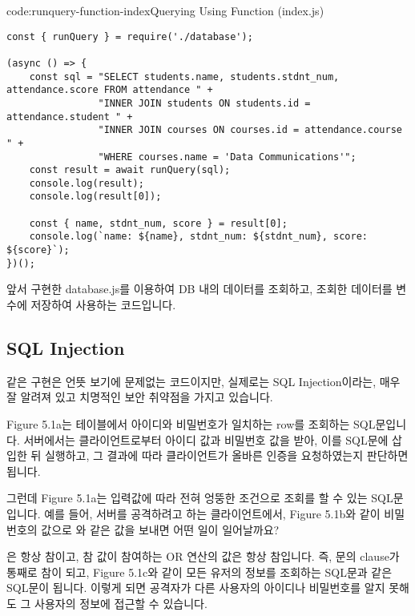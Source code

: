 \begin{codeenv}{code:runquery-function-index}{Querying Using  Function (index.js)}\begin{verbatim}
const { runQuery } = require('./database');

(async () => {
    const sql = "SELECT students.name, students.stdnt_num, attendance.score FROM attendance " +
                "INNER JOIN students ON students.id = attendance.student " +
                "INNER JOIN courses ON courses.id = attendance.course " +
                "WHERE courses.name = 'Data Communications'";
    const result = await runQuery(sql);
    console.log(result);
    console.log(result[0]);

    const { name, stdnt_num, score } = result[0];
    console.log(`name: ${name}, stdnt_num: ${stdnt_num}, score: ${score}`);
})();
\end{verbatim}
\end{codeenv}

\는 앞서 구현한 database.js를 이용하여 DB 내의 데이터를 조회하고, 조회한 데이터를 변수에 저장하여 사용하는 코드입니다.

\subsection*{SQL Injection}

\과 같은 구현은 언뜻 보기에 문제없는 코드이지만, 실제로는 SQL Injection이라는, 매우 잘 알려져 있고 치명적인 보안 취약점을 가지고 있습니다.


Figure 5.1a는  테이블에서 아이디와 비밀번호가 일치하는 row를 조회하는 SQL문입니다. 서버에서는 클라이언트로부터 아이디 값과 비밀번호 값을 받아, 이를 SQL문에 삽입한 뒤 실행하고, 그 결과에 따라 클라이언트가 올바른 인증을 요청하였는지 판단하면 됩니다.

그런데 Figure 5.1a는 입력값에 따라 전혀 엉뚱한 조건으로 조회를 할 수 있는 SQL문입니다. 예를 들어, 서버를 공격하려고 하는 클라이언트에서, Figure 5.1b와 같이 비밀번호의 값으로 와 같은 값을 보내면 어떤 일이 일어날까요?

은 항상 참이고, 참 값이 참여하는 OR 연산의 값은 항상 참입니다. 즉, 문의  clause가 통째로 참이 되고, Figure 5.1c와 같이 모든 유저의 정보를 조회하는 SQL문과 같은 SQL문이 됩니다. 이렇게 되면 공격자가 다른 사용자의 아이디나 비밀번호를 알지 못해도 그 사용자의 정보에 접근할 수 있습니다.

